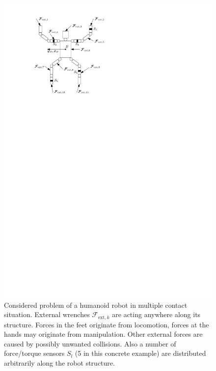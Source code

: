 \begin{figure}
\begin{center}
\includegraphics{figures/humanoid_contact_situation}
\end{center}
\caption{Considered problem of a humanoid robot in multiple contact situation.
External wrenches $\bm{\mathcal{F}}_{\mathrm{ext},k}$ are acting anywhere along its structure.
Forces in the feet originate from locomotion, forces at the hands may originate from manipulation.
Other external forces are caused by possibly unwanted collisions.
Also a number of force/torque sensors $S_l$ (5 in this concrete example) are distributed arbitrarily along the robot structure.}\vspace*{-0.7cm}
\label{fig:humanoid_contact_situation}
\end{figure}

